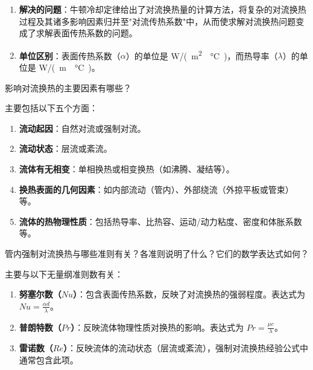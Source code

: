 \begin{solution}
\begin{enumerate}
  \item \textbf{解决的问题}：牛顿冷却定律给出了对流换热量的计算方法，将复杂的对流换热过程及其诸多影响因素归并至"对流传热系数"中，从而使求解对流换热问题变成了求解表面传热系数的问题。
  \item \textbf{单位区别}：表面传热系数（\(\alpha\)）的单位是 \unit{W/(m^2 \cdot \degreeCelsius)}，而热导率（\(\lambda\)）的单位是 \unit{W/(m \cdot \degreeCelsius)}。
\end{enumerate}
\end{solution}

\begin{problem}
影响对流换热的主要因素有哪些？
\end{problem}

\begin{solution}
主要包括以下五个方面：
\begin{enumerate}
  \item \textbf{流动起因}：自然对流或强制对流。
  \item \textbf{流动状态}：层流或紊流。
  \item \textbf{流体有无相变}：单相换热或相变换热（如沸腾、凝结等）。
  \item \textbf{换热表面的几何因素}：如内部流动（管内）、外部绕流（外掠平板或管束）等。
  \item \textbf{流体的热物理性质}：包括热导率、比热容、运动/动力粘度、密度和体胀系数等。
\end{enumerate}
\end{solution}

\begin{problem}
管内强制对流换热与哪些准则有关？各准则说明了什么？它们的数学表达式如何？
\end{problem}

\begin{solution}
主要与以下无量纲准则数有关：
\begin{enumerate}
  \item \textbf{努塞尔数（\(Nu\)）}：包含表面传热系数，反映了对流换热的强弱程度。表达式为 \(Nu=\frac{\alpha d}{\lambda}\)。
  \item \textbf{普朗特数（\(Pr\)）}：反映流体物理性质对换热的影响。表达式为 \(Pr=\frac{\mu c}{\lambda}\)。
  \item \textbf{雷诺数（\(Re\)）}：反映流体的流动状态（层流或紊流），强制对流换热经验公式中通常包含此项。
\end{enumerate}
\end{solution}

